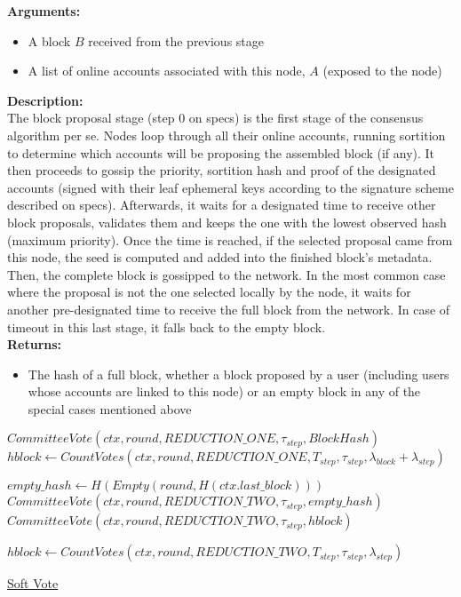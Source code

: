 \documentclass[10pt,a4paper]{article}
\begin{document}
\noindent \textbf{Arguments:}
\begin{itemize}
    \item A block $B$ received from the previous stage
    \item A list of online accounts associated with this node, $A$ (exposed to the node)
  \end{itemize}

\noindent \textbf{Description:}\\
The block proposal stage (step 0 on specs) is the first stage of the 
consensus algorithm per se. Nodes loop through all their online accounts, 
running sortition to determine which accounts will be proposing the 
assembled block (if any).
It then proceeds to gossip the priority, sortition hash and proof of 
the designated accounts (signed with their leaf ephemeral keys according 
to the signature scheme described on specs).
Afterwards, it waits for a designated time to receive other block proposals, 
validates them and keeps the one with the lowest observed hash (maximum 
priority).
Once the time is reached, if the selected proposal came from this node, 
the seed is computed and added into the finished block's metadata. 
Then, the complete block is gossipped to the network.
In the most common case where the proposal is not the one selected 
locally by the node, it waits for another pre-designated time to 
receive the full block from the network.
In case of timeout in this last stage, it falls back to the empty block.\\

\noindent \textbf{Returns:}
\begin{itemize}
    \item The hash of a full block, whether a block proposed by a user (including users whose accounts are 
    linked to this node) or an empty block in any of the special cases mentioned above
  \end{itemize}

\begin{algorithm}
    \begin{algorithmic}[H]
    
    \State $CommitteeVote(ctx, round, REDUCTION\_ONE, \tau_{step}, BlockHash)$
    \State $hblock \gets CountVotes(ctx, round, REDUCTION\_ONE, T_{step}, \tau_{step}, \lambda_{block} + \lambda_{step})$

    \State $empty\_hash \gets H(Empty(round, H(ctx.last\_block)))$ 
        \State $CommitteeVote(ctx, round, REDUCTION\_TWO, \tau_{step}, empty\_hash)$
    \Else
        {\State $CommitteeVote(ctx, round, REDUCTION\_TWO, \tau_{step}, hblock)$}
    \EndIf\

    \State $hblock \gets CountVotes(ctx, round, REDUCTION\_TWO, T_{step}, \tau_{step}, \lambda_{step})$ 


    \EndFunction
    \end{algorithmic}
    \caption{\underline{Soft Vote}}
\end{algorithm}
\end{document}
